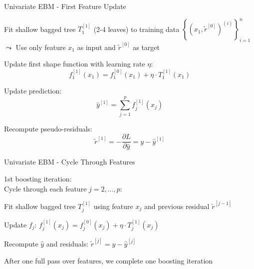\documentclass[10pt,compress,t,notes=noshow, xcolor=table]{beamer}
\begin{document}
\begin{framev}[align=top]{Univariate EBM - First Feature Update}
\spacer[0.25]
\begin{itemizeM}
\item Fit shallow bagged tree $T_1^{[1]}$ (2-4 leaves) to training data $\left\{\left(x_1, \tilde{r}^{[0]}\right)^{(i)}\right\}_{i=1}^n$\\
$\leadsto$ Use only feature $x_1$ as input and $\tilde{r}^{[0]}$ as target
\item Update first shape function with learning rate $\eta$:
$$
f_1^{[1]}(x_1) = f_1^{[0]}(x_1) + \eta \cdot T_1^{[1]}(x_1)
$$
\item Update prediction:
$$
\hat{y}^{[1]} = \sum_{j=1}^p f_j^{[1]}(x_j)
$$
\item Recompute pseudo-residuals:
$$
\tilde{r}^{[1]} = -\frac{\partial L}{\partial \hat{y}} = y - \hat{y}^{[1]}
$$
\end{itemizeM}
\end{framev}


\begin{framev}[align=top]{Univariate EBM - Cycle Through Features}
\spacer[0.25]
\begin{itemizeM}
\item 1st boosting iteration:\\
Cycle through each feature $j = 2,\dots,p$:
\begin{itemizeS}
\item Fit shallow bagged tree $T_j^{[1]}$ using feature $x_j$ and previous residual $\tilde{r}^{[j-1]}$ %
\item Update $f_j$: $f_j^{[1]}(x_j) = f_j^{[0]}(x_j) + \eta \cdot T_j^{[1]}(x_j)$
\item Recompute $\hat{y}$ and residuals: $\tilde{r}^{[j]} = y - \hat{y}^{[j]}$
\end{itemizeS}
\item After one full pass over features, we complete one boosting iteration
\end{itemizeM}
\end{framev}
\end{document}
